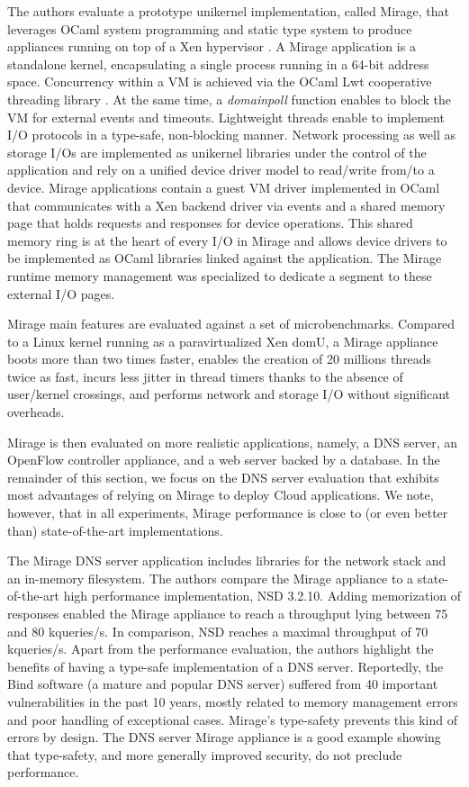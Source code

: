The authors evaluate a prototype unikernel implementation, called Mirage, that leverages OCaml system programming and static type system to produce appliances running on top of a Xen hypervisor \cite{DBLP:conf/sosp/BarhamDFHHHN03}.
A Mirage application is a standalone kernel, encapsulating a single process running in a 64-bit address space.
Concurrency within a VM is achieved via the OCaml Lwt cooperative threading library \cite{DBLP:conf/ml/Vouillon08}.
At the same time, a \emph{domainpoll} function enables to block the VM for external events and timeouts.
Lightweight threads enable to implement I/O protocols in a type-safe, non-blocking manner.
Network processing as well as storage I/Os are implemented as unikernel libraries under the control of the application and rely on a unified device driver model to read/write from/to a device.
Mirage applications contain a guest VM driver implemented in OCaml that communicates with a Xen backend driver via events and a shared memory page that holds requests and responses for device operations.
This shared memory ring is at the heart of every I/O in Mirage and allows device drivers to be implemented as OCaml libraries linked against the application.
The Mirage runtime memory management was specialized to dedicate a segment to these external I/O pages.

Mirage main features are evaluated against a set of microbenchmarks.
Compared to a Linux kernel running as a paravirtualized Xen domU, a Mirage appliance boots more than two times faster, enables the creation of 20 millions threads twice as fast, incurs less jitter in thread timers thanks to the absence of user/kernel crossings, and performs network and storage I/O without significant overheads.

Mirage is then evaluated on more realistic applications, namely, a DNS server, an OpenFlow controller appliance, and a web server backed by a database.
In the remainder of this section, we focus on the DNS server evaluation that exhibits most advantages of relying on Mirage to deploy Cloud applications.
We note, however, that in all experiments, Mirage performance is close to (or even better than) state-of-the-art implementations.

The Mirage DNS server application includes libraries for the network stack and an in-memory filesystem.
The authors compare the Mirage appliance to a state-of-the-art high performance implementation, NSD 3.2.10.
Adding memorization of responses enabled the Mirage appliance to reach a throughput lying between 75 and 80 kqueries/s.
In comparison, NSD reaches a maximal throughput of 70 kqueries/s.
Apart from the performance evaluation, the authors highlight the benefits of having a type-safe implementation of a DNS server.
Reportedly, the Bind software (a mature and popular DNS server) suffered from 40 important vulnerabilities in the past 10 years, mostly related to memory management errors and poor handling of exceptional cases.
Mirage's type-safety prevents this kind of errors by design.
The DNS server Mirage appliance is a good example showing that type-safety, and more generally improved security, do not preclude performance. 

